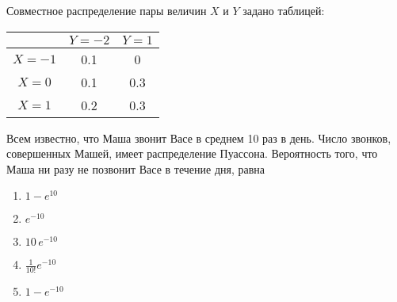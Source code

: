 \documentclass[t]{beamer}
\begin{document}
 \begin{frame} \label{13} 
\begin{block}{13} 

Совместное распределение пары величин $X$ и $Y$ задано таблицей:

\begin{center}
\begin{tabular}{c|cc}
 & $Y=-2$ & $Y=1$ \\
\hline
$X=-1$ & 0.1 & 0 \\
$X=0$ & 0.1 & 0.3 \\
$X=1$ & 0.2 & 0.3 \\
\end{tabular}
\end{center}
\vspace{0.2cm} 
 
 Всем известно, что Маша звонит Васе в среднем 10 раз в день. Число звонков, совершенных Машей, имеет распределение Пуассона. Вероятность того, что Маша ни разу не позвонит Васе в течение дня, равна

 \end{block} 
\begin{enumerate} 
\item[] \hyperlink{13-No}{\beamergotobutton{} $1 - e^{10}$}
\item[] \hyperlink{13-Yes}{\beamergotobutton{} $e^{-10}$}
\item[] \hyperlink{13-No}{\beamergotobutton{} $10\,e^{-10}$}
\item[] \hyperlink{13-No}{\beamergotobutton{} $\tfrac{1}{10!}e^{-10}$}
\item[] \hyperlink{13-No}{\beamergotobutton{} $1 - e^{-10}$}
\end{enumerate} 
\end{frame} 
\end{document}

